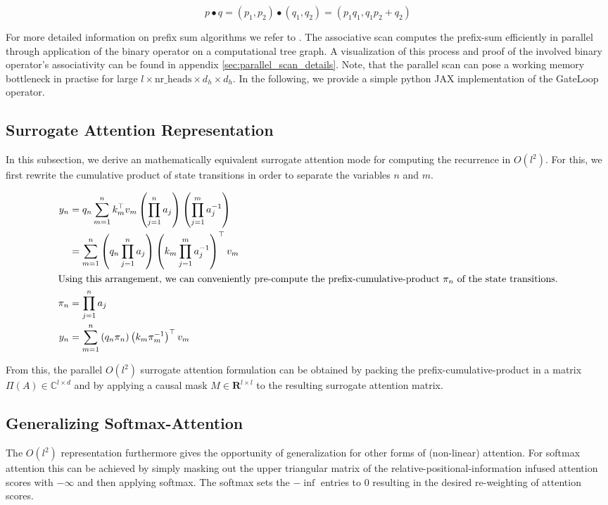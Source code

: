 \begin{equation}\label{eq:operator}
p \bullet q = (p_1, p_2) \bullet (q_1, q_2) = (p_1 q_1, q_1 p_2 + q_2)
\end{equation}

For more detailed information on prefix sum algorithms we refer to \cite{beloch90}. The associative scan computes the prefix-sum efficiently in parallel through application of the binary operator on a computational tree graph. A visualization of this process and proof of the involved binary operator's associativity can be found in appendix \ref{sec:parallel_scan_details}. Note, that the parallel scan can pose a working memory bottleneck in practise for large $l \times \text{nr\_heads} \times d_h \times d_h$. In the following, we provide a simple python JAX implementation of the GateLoop operator. 

\subsection{Surrogate Attention Representation} In this subsection, we derive an mathematically equivalent surrogate attention mode for computing the recurrence in $O(l^2)$. For this, we first rewrite the cumulative product of state transitions in order to separate the variables $n$ and $m$.

\begin{align}
y_n &= q_n \sum_{m=1}^{n} k_m^\top v_m \left( \prod_{j=1}^{n} a_j \right) \left( \prod_{j=1}^{m} a_j^{-1} \right) \\
&= \sum_{m=1}^{n} \left( q_n \prod_{j=1}^{n} a_j \right) \left( k_m \prod_{j=1}^{m} a_j^{-1} \right)^\top  v_m \\
\intertext{Using this arrangement, we can conveniently pre-compute the prefix-cumulative-product $\pi_n$ of the state transitions.}
\pi_n &= \prod_{j=1}^{n} a_j \\
y_n &= \sum_{m=1}^{n} \left(q_n \pi_n \right) \left( k_m \pi_m^{-1} \right)^\top v_m 
\end{align}

From this, the parallel $O(l^2)$ surrogate attention formulation can be obtained by packing the prefix-cumulative-product in a matrix $\Pi(A) \in \mathbb{C}^{l \times d}$ and by applying a causal mask $M \in \mathbf{R}^{l \times l}$ to the resulting surrogate attention matrix.

\subsection{Generalizing Softmax-Attention} The $O(l^2)$ representation furthermore gives the opportunity of generalization for other forms of (non-linear) attention. For softmax attention this can be achieved by simply masking out the upper triangular matrix of the relative-positional-information infused attention scores with $-\infty$ and then applying softmax. The softmax sets the $-\inf$ entries to 0 resulting in the desired re-weighting of attention scores.

